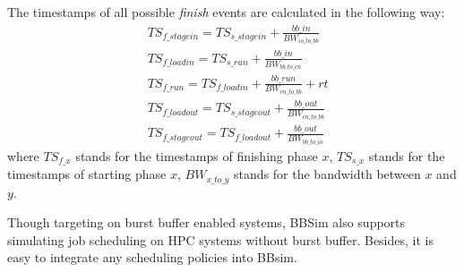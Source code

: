 % 



The timestamps of all possible \textit{finish} events are calculated in the following way:
\begin{align}
        & TS_{f\_stagein} = TS_{s\_stagein} + \frac{bb\_in}{BW_{io\_to\_bb}}\label{Equ:FinIn} \\
        & TS_{f\_loadin} = TS_{s\_run} + \frac{bb\_in}{BW_{bb\_to\_cn}}\label{Equ:FinMemIn} \\
        & TS_{f\_run} = TS_{f\_loadin} + \frac{bb\_run}{BW_{cn\_to\_bb}} + rt\label{Equ:FinRun} \\
        & TS_{f\_loadout} = TS_{s\_stageout} + \frac{bb\_out}{BW_{cn\_to\_bb}}\label{Equ:FinMemOut} \\
        & TS_{f\_stageout} = TS_{f\_loadout} + \frac{bb\_out}{BW_{bb\_to\_io}} \label{Equ:FinOut}
\end{align}
where $TS_{f\_x}$ stands for the timestamps of finishing phase $x$,
$TS_{s\_x}$ stands for the timestamps of starting phase $x$,
$BW_{x\_to\_y}$ stands for the bandwidth between $x$ and $y$.

Though targeting on burst buffer enabled systems, 
BBSim also supports simulating job scheduling on HPC systems without burst buffer.
Besides, it is easy to integrate any scheduling policies into BBsim. 
